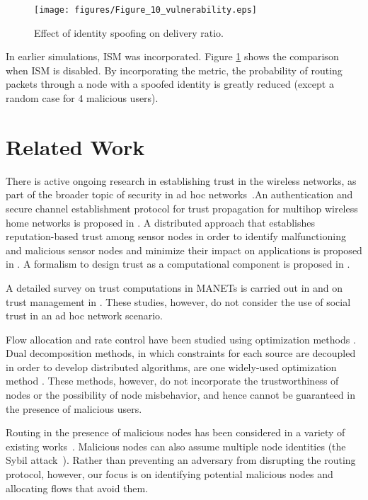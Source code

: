 \documentclass[conference]{IEEEtran}
\begin{document}
\begin{figure}[t]
\centering
\texttt{[image: figures/Figure\_10\_vulnerability.eps]}
\caption{Effect of identity spoofing on delivery ratio.}
\label{fig:vulnerability}
\end{figure}

In earlier simulations, ISM was incorporated. Figure \ref{fig:vulnerability} shows the comparison when ISM is disabled.  By incorporating the metric, the probability of routing packets through a node with a spoofed identity is greatly reduced (except a random case for 4 malicious users).

\section{Related Work}
\label{sec:related}
There is active ongoing research in establishing trust in the wireless networks, as part of the broader topic of security in ad hoc networks~\cite{hubaux2001quest}.An authentication and secure channel establishment protocol for trust propagation for multihop wireless home networks is proposed in \cite{trust_propagation}. A distributed approach that establishes reputation-based trust among sensor nodes in order to identify malfunctioning and malicious sensor nodes and minimize their impact on applications is proposed in \cite{statistical_trust}. A formalism to design trust as a computational component is proposed in \cite{trust_computational}.


 A detailed survey on trust computations in MANETs is carried out in \cite{kannan_trust} and on trust management in \cite{jinhee_trust}. These studies, however, do not consider the use of social  trust in an ad hoc network scenario.



Flow allocation and rate control have been studied using optimization methods \cite{kelly1998rate}.  Dual decomposition methods, in which constraints for each source are decoupled in order to develop distributed algorithms, are one widely-used optimization method \cite{chiang2007layering}.  These methods, however, do not incorporate the trustworthiness of nodes or the possibility of node misbehavior, and hence cannot be guaranteed in the presence of malicious users.

Routing in the presence of malicious nodes has been considered in a variety of existing works~\cite{marti2000mitigating,karlof2003secure}.  Malicious nodes can also assume multiple node identities (the Sybil attack~\cite{newsome2004sybil,yu2006sybilguard}).  Rather than preventing an adversary from disrupting the routing protocol, however, our focus is on identifying potential malicious nodes and allocating flows that avoid them.
\end{document}
